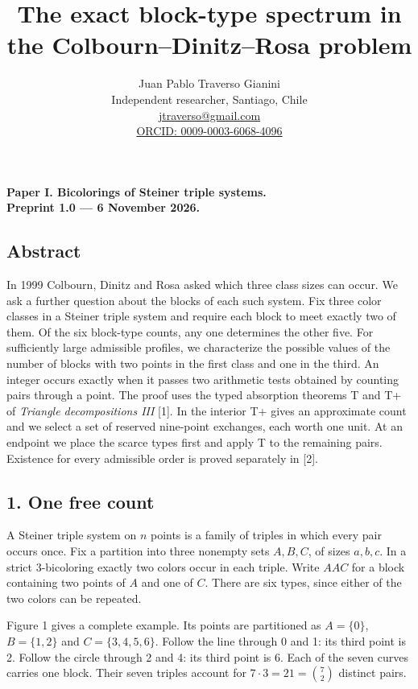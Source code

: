 \documentclass[english,11pt,a4paper]{article}
\title{The exact block-type spectrum in the Colbourn–Dinitz–Rosa problem}
\author{Juan Pablo Traverso Gianini\\\small Independent researcher, Santiago, Chile\\\small \href{mailto:jtraverso@gmail.com}{jtraverso@gmail.com}\\\small \href{https://orcid.org/0009-0003-6068-4096}{ORCID: 0009-0003-6068-4096}}
\date{}
\newcounter{none}
\begin{document}
\raggedbottom
\maketitle
\textbf{Paper I. Bicolorings of Steiner triple systems.}\\\textbf{Preprint 1.0 — 6 November 2026.}

\subsection{Abstract}\label{abstract}

In 1999 Colbourn, Dinitz and Rosa asked which three class sizes can occur. We ask a further question about the blocks of each such system. Fix three color classes in a Steiner triple system and require each block to meet exactly two of them. Of the six block-type counts, any one determines the other five. For sufficiently large admissible profiles, we characterize the possible values of the number of blocks with two points in the first class and one in the third. An integer occurs exactly when it passes two arithmetic tests obtained by counting pairs through a point. The proof uses the typed absorption theorems T and T+ of \emph{Triangle decompositions III} {[}1{]}. In the interior T+ gives an approximate count and we select a set of reserved nine-point exchanges, each worth one unit. At an endpoint we place the scarce types first and apply T to the remaining pairs. Existence for every admissible order is proved separately in {[}2{]}.

\subsection{1. One free count}\label{one-free-count}

A Steiner triple system on \(n\) points is a family of triples in which every pair occurs once. Fix a partition into three nonempty sets \(A,B,C\), of sizes \(a,b,c\). In a strict 3-bicoloring exactly two colors occur in each triple. Write \(AAC\) for a block containing two points of \(A\) and one of \(C\). There are six types, since either of the two colors can be repeated.

Figure 1 gives a complete example. Its points are partitioned as \(A=\{0\}\), \(B=\{1,2\}\) and \(C=\{3,4,5,6\}\). Follow the line through 0 and 1: its third point is 2. Follow the circle through 2 and 4: its third point is 6. Each of the seven curves carries one block. Their seven triples account for \(7\cdot3=21=\binom72\) distinct pairs.
\end{document}
